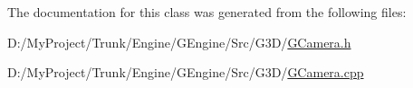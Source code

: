 The documentation for this class was generated from the following files\+:\begin{DoxyCompactItemize}
\item 
D\+:/\+My\+Project/\+Trunk/\+Engine/\+G\+Engine/\+Src/\+G3\+D/\hyperlink{_g_camera_8h}{G\+Camera.\+h}\item 
D\+:/\+My\+Project/\+Trunk/\+Engine/\+G\+Engine/\+Src/\+G3\+D/\hyperlink{_g_camera_8cpp}{G\+Camera.\+cpp}\end{DoxyCompactItemize}
